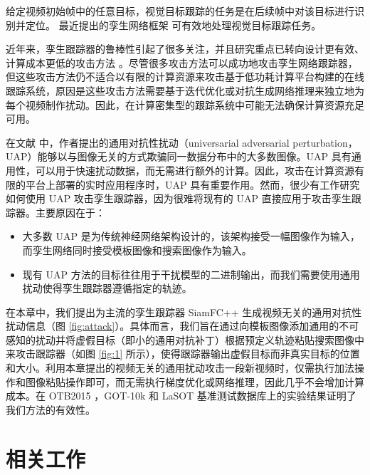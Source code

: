 给定视频初始帧中的任意目标，视觉目标跟踪的任务是在后续帧中对该目标进行识别并定位。
最近提出的孪生网络框架 \cite{SiamFC,SiamRPN,SiamRPN++,SiamFC++} 可有效地处理视觉目标跟踪任务。

近年来，孪生跟踪器的鲁棒性引起了很多关注，并且研究重点已转向设计更有效、计算成本更低的攻击方法 \cite{TTP,FAN,SPARK}。尽管很多攻击方法可以成功地攻击孪生网络跟踪器，但这些攻击方法仍不适合以有限的计算资源来攻击基于低功耗计算平台构建的在线跟踪系统，原因是这些攻击方法需要基于迭代优化或对抗生成网络推理来独立地为每个视频制作扰动。因此，在计算密集型的跟踪系统中可能无法确保计算资源充足可用。

在文献 \cite{UAP} 中，作者提出的通用对抗性扰动（universarial adversarial perturbation，UAP）能够以与图像无关的方式欺骗同一数据分布中的大多数图像。UAP 具有通用性，可以用于快速扰动数据，而无需进行额外的计算。因此，攻击在计算资源有限的平台上部署的实时应用程序时，UAP 具有重要作用。然而，很少有工作研究如何使用 UAP 攻击孪生跟踪器，因为很难将现有的 UAP 直接应用于攻击孪生跟踪器。主要原因在于：
\begin{itemize}
\item 大多数 UAP 是为传统神经网络架构设计的，该架构接受一幅图像作为输入，而孪生网络同时接受模板图像和搜索图像作为输入。
\item 现有 UAP 方法的目标往往用于干扰模型的二进制输出，而我们需要使用通用扰动使得孪生跟踪器遵循指定的轨迹。
\end{itemize}

在本章中，我们提出为主流的孪生跟踪器 SiamFC++ \cite{SiamFC++} 生成视频无关的通用对抗性扰动信息（图 \ref{fig:attack}）。具体而言，我们旨在通过向模板图像添加通用的不可感知的扰动并将虚假目标（即小的通用对抗补丁）根据预定义轨迹粘贴搜索图像中来攻击跟踪器（如图 \ref{fig:1} 所示），使得跟踪器输出虚假目标而非真实目标的位置和大小。利用本章提出的视频无关的通用扰动攻击一段新视频时，仅需执行加法操作和图像粘贴操作即可，而无需执行梯度优化或网络推理，因此几乎不会增加计算成本。在 OTB2015 \cite{OTB}，GOT-10k \cite{GOT-10k} 和 LaSOT \cite{LaSOT} 基准测试数据库上的实验结果证明了我们方法的有效性。
\section{相关工作}


